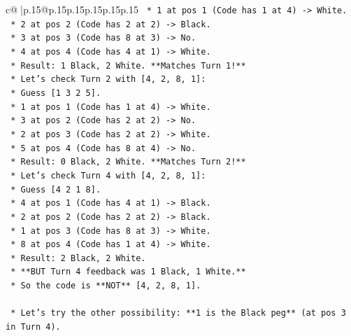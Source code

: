 \documentclass{article}
\begin{document}
{\begin{supertabular}{c@{$\;$}|p{.15\linewidth}@{}p{.15\linewidth}p{.15\linewidth}p{.15\linewidth}p{.15\linewidth}p{.15\linewidth}}
{{{\texttt{                        *   1 at pos 1 (Code has 1 at 4) {-}> White.} \\
\texttt{                        *   2 at pos 2 (Code has 2 at 2) {-}> Black.} \\
\texttt{                        *   3 at pos 3 (Code has 8 at 3) {-}> No.} \\
\texttt{                        *   4 at pos 4 (Code has 4 at 1) {-}> White.} \\
\texttt{                        *   Result: 1 Black, 2 White. **Matches Turn 1!**} \\
\texttt{                    *   Let's check Turn 2 with {[}4, 2, 8, 1{]}:} \\
\texttt{                        *   Guess {[}1 3 2 5{]}.} \\
\texttt{                        *   1 at pos 1 (Code has 1 at 4) {-}> White.} \\
\texttt{                        *   3 at pos 2 (Code has 2 at 2) {-}> No.} \\
\texttt{                        *   2 at pos 3 (Code has 2 at 2) {-}> White.} \\
\texttt{                        *   5 at pos 4 (Code has 8 at 4) {-}> No.} \\
\texttt{                        *   Result: 0 Black, 2 White. **Matches Turn 2!**} \\
\texttt{                    *   Let's check Turn 4 with {[}4, 2, 8, 1{]}:} \\
\texttt{                        *   Guess {[}4 2 1 8{]}.} \\
\texttt{                        *   4 at pos 1 (Code has 4 at 1) {-}> Black.} \\
\texttt{                        *   2 at pos 2 (Code has 2 at 2) {-}> Black.} \\
\texttt{                        *   1 at pos 3 (Code has 8 at 3) {-}> White.} \\
\texttt{                        *   8 at pos 4 (Code has 1 at 4) {-}> White.} \\
\texttt{                        *   Result: 2 Black, 2 White.} \\
\texttt{                        *   **BUT Turn 4 feedback was 1 Black, 1 White.**} \\
\texttt{                        *   So the code is **NOT** {[}4, 2, 8, 1{]}.} \\
\\ 
\texttt{                *   Let's try the other possibility: **1 is the Black peg** (at pos 3 in Turn 4).} \\
}}}
\end{supertabular}}
\end{document}
